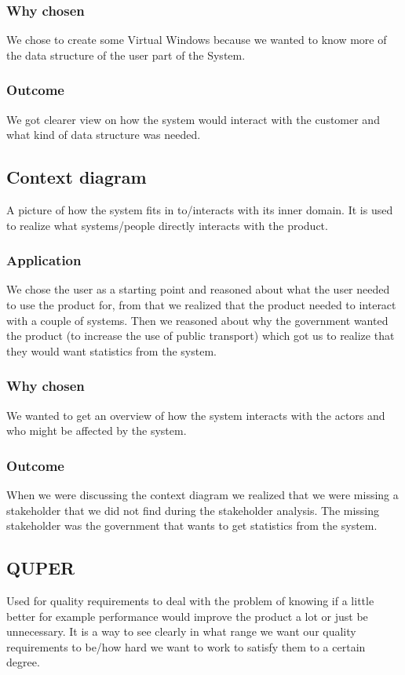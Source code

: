 \documentclass[a4paper]{article}
\begin{document}
			\subsubsection{Why chosen}
				We chose to create some Virtual Windows because we wanted to know more of the data structure of the user part of the System.
			\subsubsection{Outcome}
				We got clearer view on how the system would interact with the customer and what kind of data structure was needed.
		\subsection{Context diagram} \label{subsec:context}
		A picture of how the system fits in to/interacts with its inner domain. It is used to realize what systems/people directly interacts with the product.
			\subsubsection{Application}
			We chose the user as a starting point and reasoned about what the user needed to use the product for, from that we realized that the product needed to interact with a couple of systems. Then we reasoned about why the government wanted the product (to increase the use of public transport) which got us to realize that they would want statistics from the system.
			\subsubsection{Why chosen}
			We wanted to get an overview of how the system interacts with the actors and who might be affected by the system.
			\subsubsection{Outcome}
			When we were discussing the context diagram we realized that we were missing a stakeholder that we did not find during the stakeholder analysis. The missing stakeholder was the government that wants to get statistics from the system. 

		\subsection{QUPER}
		Used for quality requirements to deal with the problem of knowing if a little better for example performance would improve the product a lot or just be unnecessary. It is a way to see clearly in what range we want our quality requirements to be/how hard we want to work to satisfy them to a certain degree.
\end{document}
